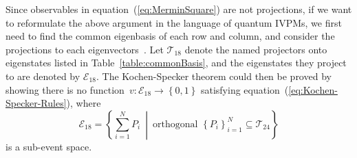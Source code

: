 \documentclass[english,reprint, aps, prl,superscriptaddress, showpacs,
showkeys, longbibliography, amsmath, amssymb]{revtex4-1}
\theoremstyle{plain}
\theoremstyle{definition}
\newcommand{\events}{\ensuremath{\mathcal{E}}}
\newcommand{\set}[2]{\ensuremath{\left\{ {#1}~\middle|~{#2}\right\} }}
\begin{document}
Since observables in equation~(\ref{eq:MerminSquare}) are not projections,
if we want to reformulate the above argument in the language of quantum
IVPMs, we first need to find the common eigenbasis of each row and
column, and consider the projections to each eigenvectors~\cite{peres1995quantum,CabelloEstebaranzGarcia-Alcaine1996,Cabello_2008}.
Let $\mathcal{T}_{18}$ denote the named projectors onto eigenstates
listed in Table~\ref{table:commonBasis}, and the eigenstates they
project to are denoted by $\events_{18}$. The Kochen-Specker theorem
could then be proved by showing there is no function~$v:\events_{18}\rightarrow\left\{ 0,1\right\} $
satisfying equation~(\ref{eq:Kochen-Specker-Rules}), where
\begin{equation}
\events_{18}=\set{\sum_{i=1}^{N}P_{i}}{\textrm{orthogonal }\left\{ P_{i}\right\} _{i=1}^{N}\subseteq\mathcal{T}_{24}}
\end{equation}
is a sub-event space.
\end{document}
